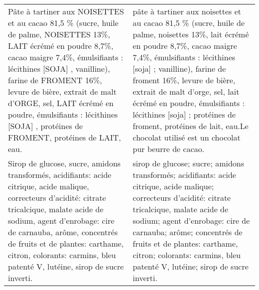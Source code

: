 \begin{tabular}{p{7cm}p{7cm}}
                                                                                                                                                                                                                                                                                                                                                                                                                                              Pâte à tartiner aux NOISETTES et au cacao 81,5 \% (sucre, huile de palme, NOISETTES 13\%, LAIT écrémé en poudre 8,7\%, cacao maigre 7,4\%, émulsifiants : lécithines [SOJA] , vanilline), farine de FROMENT 16\%, levure de bière, extrait de malt d'ORGE, sel, LAIT écrémé en poudre, émulsifiants : lécithines [SOJA] , protéines de FROMENT, protéines de LAIT, eau. &                                                                                                                                                                                                                                                                                                                                                                               pâte à tartiner aux noisettes et au cacao 81,5 \% (sucre, huile de palme, noisettes 13\%, lait écrémé en poudre 8,7\%, cacao maigre 7,4\%, émulsifiants : lécithines [soja] ; vanilline), farine de froment 16\%, levure de bière, extrait de malt d'orge, sel, lait écrémé en poudre, émulsifiants : lécithines [soja] ; protéines de froment, protéines de lait, eau.\newline Le chocolat utilisé est un chocolat pur beurre de cacao. \\
                                                                                                                                                                                                                                                                                                                                                                                                                                                                             Sirop de glucose, sucre, amidons transformés, acidifiants: acide citrique, acide malique, correcteurs d'acidité: citrate tricalcique, malate acide de sodium, agent d'enrobage: cire de carnauba, arôme, concentrés de fruits et de plantes: carthame, citron, colorants: carmins, bleu patenté V, lutéine, sirop de sucre inverti. &                                                                                                                                                                                                                                                                                                                                                                                                                                                                        sirop de glucose; sucre; amidons transformés; acidifiants: acide citrique, acide malique; correcteurs d'acidité: citrate tricalcique, malate acide de sodium; agent d'enrobage: cire de carnauba; arôme; concentrés de fruits et de plantes: carthame, citron; colorants: carmins, bleu patenté V, lutéine; sirop de sucre inverti. \\

\end{tabular}
